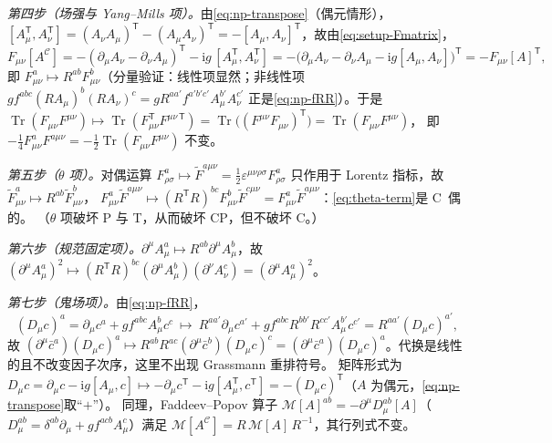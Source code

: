 \documentclass[UTF8,a4paper,11pt,fontset=fandol]{ctexart}
\makeatletter
\theoremstyle{cplain}
\theoremstyle{cdefinition}
\theoremstyle{cremark}
\renewcommand{\proofname}{证明}
\renewenvironment{proof}[1][\proofname]{\par\pushQED{\qed}\normalfont\topsep6\p@\@plus6\p@\relax
  \trivlist\item[\hskip\labelsep\itshape #1\hspace{0.5em}]\ignorespaces}{\popQED\endtrivlist\@endpefalse}
\numberwithin{equation}{section}
\DeclareMathOperator{\Tr}{Tr}
\newcommand{\tp}{\mathsf{T}}                         %
\newcommand{\Cop}{\mathcal{C}}                       %
\newcommand{\ii}{\mathrm{i}}                        %
\makeatother
\begin{document}
\begin{proof}
\emph{第四步（场强与 Yang--Mills 项）。}由\cref{eq:np-transpose}（偶元情形），$[A^{\tp}_\mu,A^{\tp}_\nu]=(A_\nu A_\mu)^{\tp}-(A_\mu A_\nu)^{\tp}=-[A_\mu,A_\nu]^{\tp}$，故由\cref{eq:setup-Fmatrix}，
\begin{equation}\label{eq:np-F}
F_{\mu\nu}[A^{\Cop}]=-(\partial_\mu A_\nu-\partial_\nu A_\mu)^{\tp}-\ii g\,[A^{\tp}_\mu,A^{\tp}_\nu]
=-\bigl(\partial_\mu A_\nu-\partial_\nu A_\mu-\ii g[A_\mu,A_\nu]\bigr)^{\tp}=-F_{\mu\nu}[A]^{\tp},
\end{equation}
即 $F^a_{\mu\nu}\mapsto R^{ab}F^b_{\mu\nu}$（分量验证：线性项显然；非线性项 $gf^{abc}(RA_\mu)^b(RA_\nu)^c=gR^{aa'}f^{a'b'c'}A^{b'}_\mu A^{c'}_\nu$ 正是\cref{eq:np-fRR}）。于是
$\Tr(F_{\mu\nu}F^{\mu\nu})\mapsto\Tr(F^{\tp}_{\mu\nu}F^{\mu\nu\,\tp})=\Tr\bigl((F^{\mu\nu}F_{\mu\nu})^{\tp}\bigr)=\Tr(F_{\mu\nu}F^{\mu\nu})$，
即 $-\frac14F^a_{\mu\nu}F^{a\mu\nu}=-\frac12\Tr(F_{\mu\nu}F^{\mu\nu})$ 不变。

\emph{第五步（$\theta$ 项）。}对偶运算 $F^a_{\rho\sigma}\mapsto\tilde F^{a\mu\nu}=\frac12\varepsilon^{\mu\nu\rho\sigma}F^a_{\rho\sigma}$ 只作用于 Lorentz 指标，故 $\tilde F^a_{\mu\nu}\mapsto R^{ab}\tilde F^b_{\mu\nu}$，
$F^a_{\mu\nu}\tilde F^{a\mu\nu}\mapsto(R^{\tp}R)^{bc}F^b_{\mu\nu}\tilde F^{c\mu\nu}=F^a_{\mu\nu}\tilde F^{a\mu\nu}$：\cref{eq:theta-term}是 C~偶的。
（$\theta$ 项破坏 P 与 T，从而破坏 CP，但不破坏 C。）

\emph{第六步（规范固定项）。}$\partial^\mu A^a_\mu\mapsto R^{ab}\partial^\mu A^b_\mu$，故 $(\partial^\mu A^a_\mu)^2\mapsto(R^{\tp}R)^{bc}(\partial^\mu A^b_\mu)(\partial^\nu A^c_\nu)=(\partial^\mu A^a_\mu)^2$。

\emph{第七步（鬼场项）。}由\cref{eq:np-fRR}，
\begin{equation}\label{eq:np-Dc}
(D_\mu c)^a=\partial_\mu c^a+gf^{abc}A^b_\mu c^c\ \longmapsto\ R^{aa'}\partial_\mu c^{a'}+gf^{abc}R^{bb'}R^{cc'}A^{b'}_\mu c^{c'}=R^{aa'}(D_\mu c)^{a'},
\end{equation}
故 $(\partial^\mu\bar c^a)(D_\mu c)^a\mapsto R^{ab}R^{ac}(\partial^\mu\bar c^b)(D_\mu c)^c=(\partial^\mu\bar c^a)(D_\mu c)^a$。代换是线性的且不改变因子次序，这里不出现 Grassmann 重排符号。
矩阵形式为 $D_\mu c=\partial_\mu c-\ii g[A_\mu,c]\mapsto-\partial_\mu c^{\tp}-\ii g[A^{\tp}_\mu,c^{\tp}]=-(D_\mu c)^{\tp}$（$A$ 为偶元，\cref{eq:np-transpose}取“$+$”）。
同理，Faddeev--Popov 算子 $\mathcal M[A]^{ab}=-\partial^\mu D^{ab}_\mu[A]$（$D^{ab}_\mu=\delta^{ab}\partial_\mu+gf^{acb}A^c_\mu$）满足 $\mathcal M[A^{\Cop}]=R\,\mathcal M[A]\,R^{-1}$，其行列式不变。


\end{proof}
\end{document}
